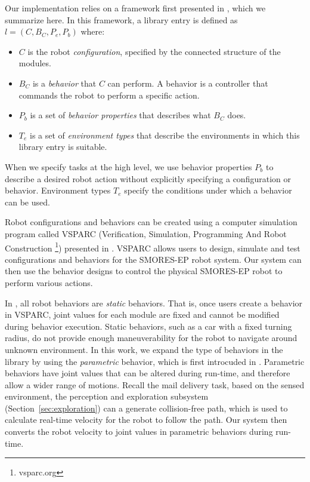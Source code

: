 \documentclass[journal]{IEEEtran}
\begin{document}
Our implementation relies on a framework first presented in \cite{Jing2016}, which we summarize here.
In this framework, a library entry is defined as $l = (C,B_C,P_e,P_b)$ where:
\begin{itemize}
\item $C$ is the robot \emph{configuration}, specified by the connected structure of the modules.
\item $B_C$ is a \emph{behavior} that $C$ can perform. A behavior is a controller that commands the robot to perform a specific action. 
\item $P_b$ is a set of \emph{behavior properties} that describes what $B_C$ does. 
\item $T_e$ is a set of \emph{environment types} that describe the environments in which this library entry is suitable. 
\end{itemize} 
%
When we specify tasks at the high level, we use behavior properties $P_b$ to describe a desired robot action without explicitly specifying a configuration or behavior.
Environment types $T_e$ specify the conditions under which a behavior can be used.

Robot configurations and behaviors can be created using a computer simulation program called VSPARC (Verification, Simulation, Programming And Robot Construction \footnote{vsparc.org}) presented in \cite{Jing2016}.
VSPARC allows users to design, simulate and test configurations and behaviors for the SMORES-EP robot system.
Our system can then use the behavior designs to control the physical SMORES-EP robot to perform various actions.

In \cite{Jing2016}, all robot behaviors are \textit{static} behaviors.
That is, once users create a behavior in VSPARC, joint values for each module are fixed and cannot be modified during behavior execution.
Static behaviors, such as a car with a fixed turning radius, do not provide enough maneuverability for the robot to navigate around unknown environment.
In this work, we expand the type of behaviors in the library by using the \textit{parametric} behavior, which is first introcuded in \cite{JingAURO2017}.
Parametric behaviors have joint values that can be altered during run-time, and therefore allow a wider range of motions.
Recall the mail delivery task, based on the sensed environment, the perception and exploration subsystem (Section~\ref{sec:exploration}) can a generate collision-free path, which is used to calculate real-time velocity for the robot to follow the path.
Our system then converts the robot velocity to joint values in parametric behaviors during run-time.
\end{document}

